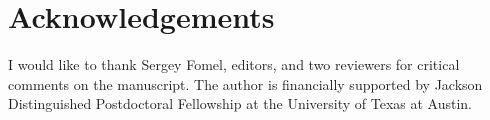 \section{Acknowledgements}
I would like to thank Sergey Fomel, editors, and two reviewers for critical comments on the manuscript. The author is financially supported by Jackson Distinguished Postdoctoral Fellowship at the University of Texas at Austin. 

\newpage



